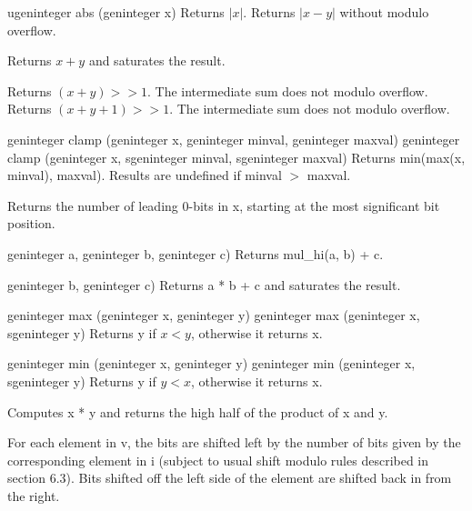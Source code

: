 \addRow
{
ugeninteger abs (geninteger x)
}
{
Returns $| x |$.
}
{ Returns $| x - y |$  without modulo overflow.}

{ Returns $x + y$ and saturates the result.}

{
 Returns $(x + y) >> 1$. The intermediate sum does
not modulo overflow.
}
 {
 Returns $(x + y + 1) >> 1$. The intermediate sum
does not modulo overflow.
}

\addRowTwoL
{geninteger clamp (geninteger x, geninteger minval, geninteger maxval)}
{geninteger clamp (geninteger x, sgeninteger minval, sgeninteger maxval)}
{
 Returns min(max(x, minval), maxval).
 Results are undefined if minval $>$ maxval.
}

{
 Returns the number of leading 0-bits in x, starting
 at the most significant bit position.
}

{geninteger a, geninteger b, geninteger c)}
 {Returns mul\_hi(a, b) + c. }

{geninteger b, geninteger c)}
{Returns a * b + c and saturates the result.}

\addRowTwoSL
{geninteger max (geninteger x, geninteger y)}
{geninteger max (geninteger x, sgeninteger y)}
{Returns y if $x < y$, otherwise it returns x.}


\addRowTwoSL
{geninteger min (geninteger x, geninteger y)}
{geninteger min (geninteger x, sgeninteger y)}
{Returns y if $y < x$, otherwise it returns x.}

{
Computes x * y and returns the high half of the
product of x and y.
}

{
For each element in v, the bits are shifted left by
the number of bits given by the corresponding
element in i (subject to usual shift modulo rules
described in section 6.3). Bits shifted off the left
side of the element are shifted back in from the
right.
}


